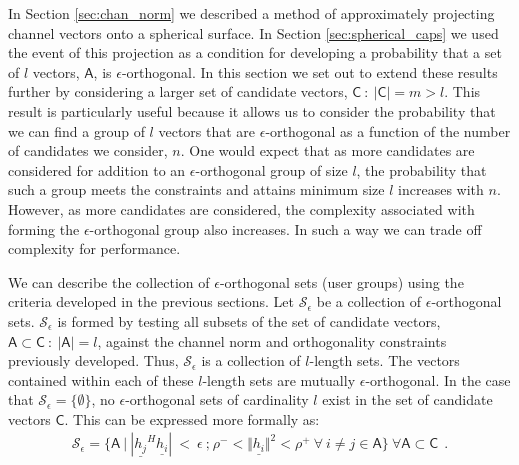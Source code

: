 In Section \ref{sec:chan_norm} we described a method of approximately projecting channel vectors onto a spherical surface. In Section \ref{sec:spherical_caps} we used the event of this projection as a condition for developing a probability that a set of $l$ vectors, $\mathsf{A}$, is $\epsilon$-orthogonal. In this section we set out to extend these results further by considering a larger set of candidate vectors, $\mathsf{C} \ :\ \vert \mathsf{C} \vert = m >l$. This result is particularly useful because it allows us to consider the probability that we can find a group of $l$ vectors that are $\epsilon$-orthogonal as a function of the number of candidates we consider, $n$. One would expect that as more candidates are considered for addition to an $\epsilon$-orthogonal group of size $l$, the probability that such a group meets the constraints and attains minimum size $l$ increases with $n$. However, as more candidates are considered, the complexity associated with forming the $\epsilon$-orthogonal group also increases. In such a way we can trade off complexity for performance.

We can describe the collection of $\epsilon$-orthogonal sets (user groups) using the criteria developed in the previous sections. Let $\mathscr{S}_\epsilon$ be a collection of $\epsilon$-orthogonal sets. $\mathscr{S}_\epsilon$ is formed by testing all subsets of the set of candidate vectors, $\mathsf{A}\subset\mathsf{C}\ : \ \vert \mathsf{A} \vert = l$, against the channel norm and orthogonality constraints previously developed. Thus, $\mathscr{S}_\epsilon$ is a collection of $l$-length sets. The vectors contained within each of these $l$-length sets are mutually $\epsilon$-orthogonal. In the case that $\mathscr{S}_\epsilon = \lbrace \emptyset \rbrace$, no $\epsilon$-orthogonal sets of cardinality $l$ exist in the set of candidate vectors $\mathsf{C}$. This can be expressed more formally as:
 \begin{equation}\label{eq:S_e}
    \begin{aligned}
        \mathscr{S}_\epsilon = \lbrace \mathsf{A}\ \big|\ | \underline{h_j}^H\underline{h_i} |\ <\ \epsilon \ \text{;} \ \rho^-<\Vert \underline{h_i} \Vert^2 < \rho^+\ \forall \ i \neq j \in \mathsf{A} \rbrace \ \forall \mathsf{A}\subset \mathsf{C} \ \ .
    \end{aligned}
\end{equation}


